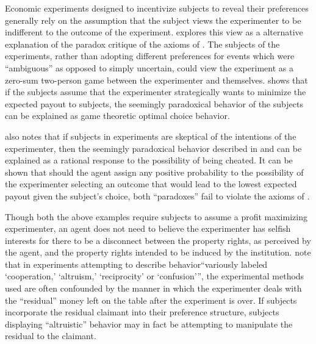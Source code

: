 \documentclass[../main.tex]{subfiles}
\begin{document}
Economic experiments designed to incentivize subjects to reveal their preferences generally rely on the assumption that the subject views the experimenter to be indifferent to the outcome of the experiment.
\textcite{Schneeweiss1973} explores this view as a alternative explanation of the \textcite{Ellsberg1961} paradox critique of the axioms of \textcite{Savage1954}.
The subjects of the \textcite{Ellsberg1961} experiments, rather than adopting different preferences for events which were \enquote{ambiguous} as opposed to simply uncertain, could view the experiment as a zero-sum two-person game between the experimenter and themselves.
\textcite{Schneeweiss1973} shows that if the subjects assume that the experimenter strategically wants to minimize the expected payout to subjects, the seemingly paradoxical behavior of the subjects can be explained as game theoretic optimal choice behavior.

\textcite{Kadane1992} also notes that if subjects in experiments are skeptical of the intentions of the experimenter, then the seemingly paradoxical behavior described in \textcite{Ellsberg1961} and \textcite{Allais1953} can be explained as a rational response to the possibility of being cheated.
It can be shown that should the agent assign any positive probability to the possibility of the experimenter selecting an outcome that would lead to the lowest expected payout given the subject's choice, both \enquote{paradoxes} fail to violate the axioms of \textcite{Savage1954}.

Though both the above examples require subjects to assume a profit maximizing experimenter, an agent does not need to believe the experimenter has selfish interests for there to be a disconnect between the property rights, as perceived by the agent, and the property rights intended to be induced by the institution.
\textcite[178]{Harrison2006} note that in experiments attempting to describe behavior\enquote{variously labeled \enquote{cooperation,} \enquote{altruism,} \enquote{reciprocity} or \enquote{confusion}}, the experimental methods used are often confounded by the manner in which the experimenter deals with the \enquote{residual} money left on the table after the experiment is over.
If subjects incorporate the residual claimant into their preference structure, subjects displaying \enquote{altruistic} behavior may in fact be attempting to manipulate the residual to the claimant.
\end{document}
